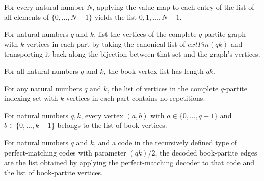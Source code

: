 \begin{theorem}
\label{FABL.map_val_finVertexList}
\leanok
{}
For every natural number $N$, applying the value map to each entry of the list of all
elements of $\{0,\ldots,N-1\}$ yields the list $0,1,\ldots,N-1$.
\end{theorem}

\begin{definition}
\label{FABL.bookVertexList}
\leanok
{}
For natural numbers $q$ and $k$, list the vertices of the complete $q$-partite graph
with $k$ vertices in each part by taking the canonical list of $	ext{Fin}(qk)$ and
transporting it back along the bijection between that set and the graph's vertices.
\end{definition}

\begin{theorem}
\label{FABL.length_bookVertexList}
\leanok
{}
For all natural numbers $q$ and $k$, the book vertex list has length $qk$.
\end{theorem}

\begin{theorem}
\label{FABL.nodup_bookVertexList}
\leanok
{}
For any natural numbers $q$ and $k$, the list of vertices in the complete $q$-partite
indexing set with $k$ vertices in each part contains no repetitions.
\end{theorem}

\begin{theorem}
\label{FABL.mem_bookVertexList}
\leanok
{}
For natural numbers $q,k$, every vertex $(a,b)$ with $a\in\{0,\ldots,q-1\}$ and
$b\in\{0,\ldots,k-1\}$ belongs to the list of book vertices.
\end{theorem}

\begin{definition}
\label{FABL.decodedBookPartiteEdges}
\leanok
{}
For natural numbers $q$ and $k$, and a code in the recursively defined type of
perfect-matching codes with parameter $(qk)/2$, the decoded book-partite edges are the
list obtained by applying the perfect-matching decoder to that code and the list of
book-partite vertices.
\end{definition}

